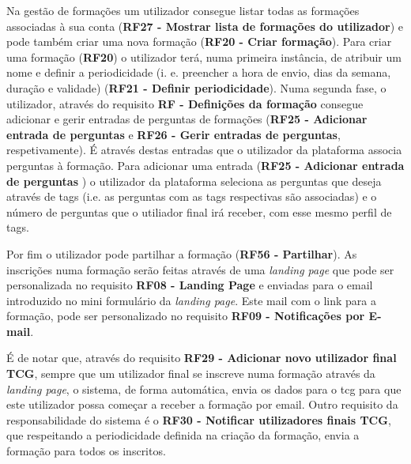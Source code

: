 Na gestão de formações um utilizador consegue listar todas as formações associadas à sua conta (\textbf{RF27 - Mostrar lista de formações do utilizador}) e pode também criar uma nova formação (\textbf{RF20 - Criar formação}).
Para criar uma formação (\textbf{RF20}) o utilizador terá, numa primeira instância, de atribuir um nome e definir a periodicidade (i. e. preencher a hora de envio, dias da semana,  duração e validade) (\textbf{RF21 - Definir periodicidade}). 
Numa segunda fase, o utilizador, através do requisito \textbf{RF - Definições da formação} consegue adicionar e gerir entradas de perguntas de formações (\textbf{RF25 - Adicionar entrada de perguntas} e \textbf{RF26 - Gerir entradas de perguntas}, respetivamente). É através destas entradas que o utilizador da plataforma associa perguntas à formação. Para adicionar uma entrada (\textbf{RF25 - Adicionar entrada de perguntas} ) o utilizador da plataforma seleciona as perguntas que deseja através de tags (i.e. as perguntas com as tags respectivas são associadas) e o número de perguntas que o utiliador final irá receber, com esse mesmo perfil de tags.

Por fim o utilizador pode partilhar a formação (\textbf{RF56 - Partilhar}). As inscrições numa formação serão feitas através de uma \textit{landing page} que pode ser personalizada no requisito \textbf{RF08 - Landing Page} e enviadas para o email introduzido no mini formulário da \textit{landing page}. Este mail com o link para a formação, pode ser personalizado no requisito \textbf{RF09 - Notificações por E-mail}. 

É de notar que, através do requisito \textbf{RF29 - Adicionar novo utilizador final TCG}, sempre que um utilizador final se inscreve numa formação através da \textit{landing page}, o sistema, de forma automática, envia os dados para o \acrshort{tcg} para que este utilizador possa começar a receber a formação por email. Outro requisito da responsabilidade do sistema é o \textbf{RF30 - Notificar utilizadores finais TCG}, que respeitando a periodicidade definida na criação da formação, envia a formação para todos os inscritos.



